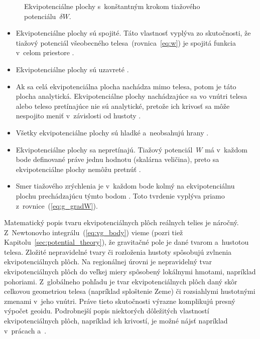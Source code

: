 \documentclass[a4paper, 12pt]{book}
\begin{document}
\begin{figure}
\centering

\caption{Ekvipotenciálne plochy s~konštantným krokom tiažového 
potenciálu~$\delta W$.}
\label{fig:equipotential_surfaces}
\end{figure}

\begin{itemize}
\item Ekvipotenciálne plochy sú spojité.  Táto vlastnosť vyplýva zo
skutočnosti, že tiažový potenciál všeobecného telesa~(rovnica~\ref{eq:w}) je 
spojitá funkcia v~celom priestore \parencite{MoritzPhysicalGeodesy}.

\item Ekvipotenciálne plochy sú uzavreté \parencite{VanicekGeodesy}.

\item Ak sa celá ekvipotenciálna plocha nachádza mimo telesa, potom je táto 
plocha analytická.  Ekvipotenciálne plochy nachádzajúce sa vo vnútri telesa 
alebo teleso pretínajúce nie sú analytické, pretože ich krivosť sa môže 
nespojito meniť v~závislosti od hustoty \parencite{MoritzPhysicalGeodesy}.

\item Všetky ekvipotenciálne plochy sú hladké a~neobsahujú hrany
\parencite{MoritzPhysicalGeodesy}.

\item Ekvipotenciálne plochy sa nepretínajú.  Tiažový potenciál~$W$ má v~každom 
bode definované práve jednu hodnotu (skalárna veličina), preto sa 
ekvipotenciálne plochy nemôžu pretnúť \parencite{MacMillan1930}.

\item Smer tiažového zrýchlenia je v~každom bode kolmý na ekvipotenciálnu
plochu prechádzajúcu týmto bodom \parencite{MoritzPhysicalGeodesy}.  Toto 
tvrdenie vyplýva priamo z~rovnice~(\ref{eq:g_gradW}).
\end{itemize}

Matematický popis tvaru ekvipotenciálnych plôch reálnych telies je náročný.  
Z~Newtonovho integrálu~(\ref{eq:vg_body}) vieme (pozri tiež 
Kapitolu~\ref{sec:potential_theory}), že gravitačné pole je dané tvarom 
a~hustotou telesa.  Zložité nepravidelné tvary či rozloženia hustoty spôsobujú 
zvlnenia ekvipotenciálnych plôch.  Na regionálnej úrovni je nepravidelný tvar 
ekvipotenciálnych plôch do veľkej miery spôsobený lokálnymi hmotami, napríklad 
pohoriami.  Z~globálneho pohľadu je tvar ekvipotenciálnych plôch daný skôr 
celkovou geometriou telesa (napríklad sploštenie Zeme) či rozsiahlymi 
hustotnými zmenami v~jeho vnútri.  Práve tieto skutočnosti výrazne komplikujú 
presný výpočet geoidu.  Podrobnejší popis niektorých dôležitých vlastností 
ekvipotenciálnych plôch, napríklad ich krivostí, je možné nájsť napríklad 
v~prácach \textcite{MoritzPhysicalGeodesy} a~\textcite{Janak2006}.
\end{document}
